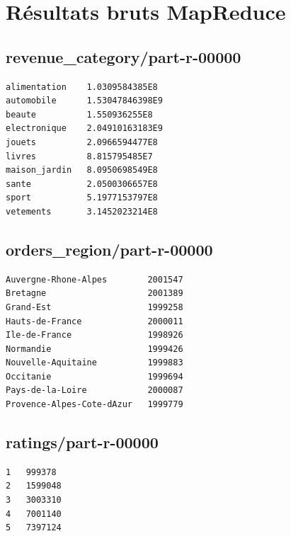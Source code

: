 \documentclass[12pt,a4paper]{article}
\begin{document}
\section{Résultats bruts MapReduce}

\subsection*{revenue\_category/part-r-00000}
\begin{lstlisting}
alimentation    1.0309584385E8
automobile      1.53047846398E9
beaute          1.550936255E8
electronique    2.04910163183E9
jouets          2.0966594477E8
livres          8.815795485E7
maison_jardin   8.0950698549E8
sante           2.0500306657E8
sport           5.1977153797E8
vetements       3.1452023214E8
\end{lstlisting}

\subsection*{orders\_region/part-r-00000}
\begin{lstlisting}
Auvergne-Rhone-Alpes        2001547
Bretagne                    2001389
Grand-Est                   1999258
Hauts-de-France             2000011
Ile-de-France               1998926
Normandie                   1999426
Nouvelle-Aquitaine          1999883
Occitanie                   1999694
Pays-de-la-Loire            2000087
Provence-Alpes-Cote-dAzur   1999779
\end{lstlisting}

\subsection*{ratings/part-r-00000}
\begin{lstlisting}
1   999378
2   1599048
3   3003310
4   7001140
5   7397124
\end{lstlisting}
\end{document}

